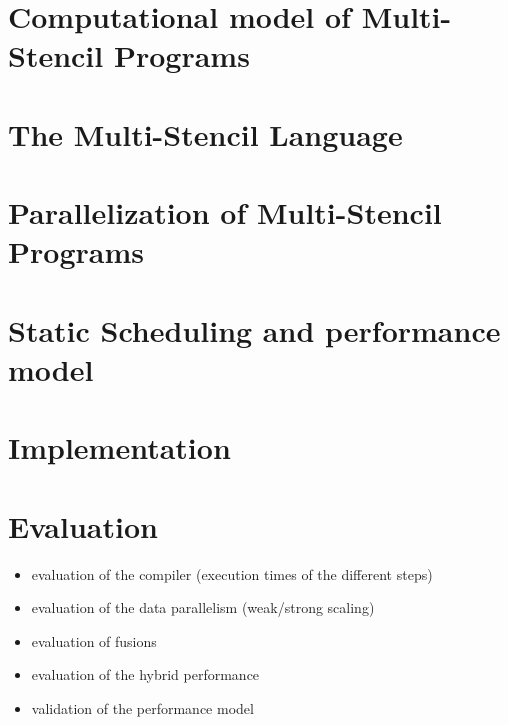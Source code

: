 \documentclass[smallextended]{svjour3}       %
\begin{document}
\section{Computational model of Multi-Stencil Programs}
\label{sect:formalism}

\section{The Multi-Stencil Language}
\label{sect:msl}

\section{Parallelization of Multi-Stencil Programs}
\label{sect:parallelism}

\section{Static Scheduling and performance model}
\label{sect:msp}

\section{Implementation}
\label{sect:comp}

\section{Evaluation}
\label{sect:eval}
\begin{itemize}
\item evaluation of the compiler (execution times of the different steps)
\item evaluation of the data parallelism (weak/strong scaling)
\item evaluation of fusions
\item evaluation of the hybrid performance
\item validation of the performance model
\end{itemize}

\end{document}
